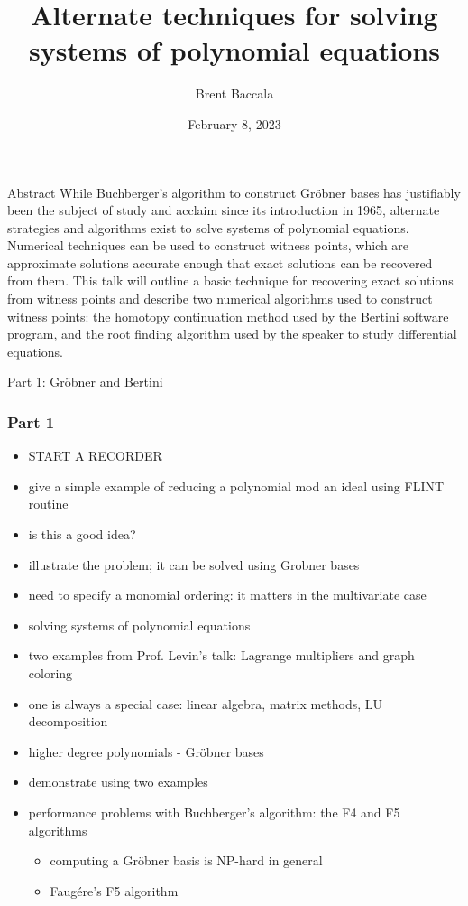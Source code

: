 \documentclass{beamer}
\title{Alternate techniques for solving systems of polynomial equations}
\author{Brent Baccala}
\institute{\tt cosine@freesoft.org}
\date{February 8, 2023}
\begin{document}
\begin{frame}
\titlepage
\begin{block}{Abstract}
\tiny
While Buchberger's algorithm to construct Gr\"obner bases has justifiably been the subject of study and acclaim since its introduction in 1965, alternate strategies and algorithms exist to solve systems of polynomial equations.  Numerical techniques can be used to construct witness points, which are approximate solutions accurate enough that exact solutions can be recovered from them.  This talk will outline a basic technique for recovering exact solutions from witness points and describe two numerical algorithms used to construct witness points: the homotopy continuation method used by the Bertini software program, and the root finding algorithm used by the speaker to study differential equations.
\end{block}
\end{frame}

\begin{frame}
\begin{exampleblock}{}
\begin{center}
\vskip 20pt
\Huge
Part 1: Gr\"obner and Bertini
\vskip 6pt
\ 
\end{center}
\end{exampleblock}
\end{frame}

\begin{frame}
\frametitle{Part 1}
\begin{itemize}
\item START A RECORDER
\item give a simple example of reducing a polynomial mod an ideal using FLINT routine
\item is this a good idea?
\item illustrate the problem; it can be solved using Grobner bases
\item need to specify a monomial ordering: it matters in the multivariate case

\item solving systems of polynomial equations
\item two examples from Prof. Levin's talk: Lagrange multipliers and graph coloring
\item one is always a special case: linear algebra, matrix methods, LU decomposition
\item higher degree polynomials - Gr\"obner bases
\item demonstrate using two examples

\item performance problems with Buchberger's algorithm: the F4 and F5 algorithms
\begin{itemize}
   \item computing a Gr\"obner basis is NP-hard in general
   \item Faug\'ere's F5 algorithm
\end{itemize}
\end{itemize}
\end{frame}
\end{document}
